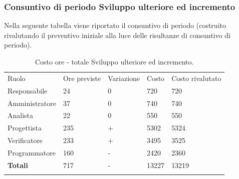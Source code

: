 \documentclass[a4paper]{article}
\begin{document}
					\subsubsection{Consuntivo di periodo Sviluppo ulteriore ed incremento}
					Nella seguente tabella viene riportato il consuntivo di periodo (costruito rivalutando il preventivo iniziale alla luce delle risultanze 
					di consuntivo di periodo).
					\begin{table}[H]
						\begin{tabularx}{\textwidth}{Y Y Y Y Y}
							Ruolo & Ore previste & Variazione & Costo & Costo rivalutato\\
							Responsabile 	& 24  & 0 & 720  & 720 \\
							Amministratore 	& 37  & 0 & 740  & 740 \\
							Analista 		& 22  & 0 & 550  & 550\\
							Progettista 	& 235 & + & 5302 & 5324\\
							Verificatore 	& 233 & + & 3495 & 3525\\
							Programmatore 	& 160 & - & 2420 & 2360\\
							\textbf{Totali} & 717 & - & 13227 & 13219\\
						\end{tabularx}
					\caption{Costo ore - totale Sviluppo ulteriore ed incremento.}
					\label{TCRendicontati}
					\end{table}
\end{document}
